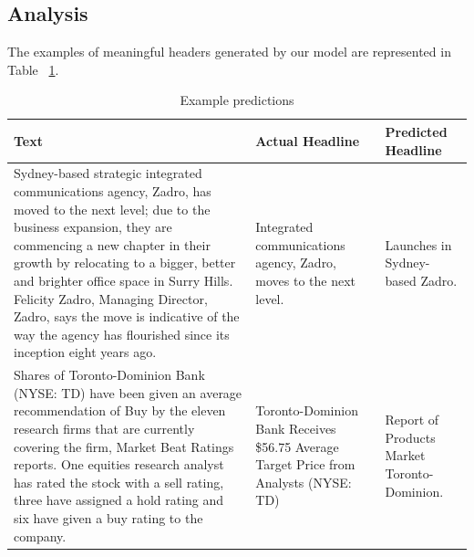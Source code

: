 \subsection{Analysis}

The examples of meaningful headers generated by our model are represented in 
Table ~\ref{tab:results-table}.

\begin{center}
\begin{table}[!htb]
\centering
\caption{Example predictions}
\label{tab:results-table}
\begin{tabular}{|l|l|l|}
\hline
\textbf{Text} & \textbf{Actual Headline} & \textbf{Predicted Headline} \\ \hline

\begin{minipage}[t]{0.4\columnwidth}%
Sydney-based strategic integrated communications agency, Zadro, has moved to the next level; due to the business expansion, they are commencing a new chapter in their growth by relocating to a bigger, better and brighter office space in Surry Hills. Felicity Zadro, Managing Director, Zadro, says the move is indicative of the way the agency has flourished since its inception eight years ago.             
\end{minipage}
 & 
\begin{minipage}[t]{0.3\columnwidth}%
 Integrated communications agency, Zadro, moves to the next level. 
\end{minipage}
 & 
\begin{minipage}[t]{0.3\columnwidth}%
 Launches in Sydney-based Zadro. 
\end{minipage}  \\ \hline


\begin{minipage}[t]{0.4\columnwidth}%
Shares of Toronto-Dominion Bank (NYSE: TD) have been given an average recommendation of Buy by the eleven research firms that are currently covering the firm, Market Beat Ratings reports. One equities research analyst has rated the stock with a sell rating, three have assigned a hold rating and six have given a buy rating to the company.           
\end{minipage}
 & 
\begin{minipage}[t]{0.3\columnwidth}%
Toronto-Dominion Bank Receives \$56.75 Average Target Price from Analysts (NYSE: TD) 
\end{minipage}
 & 
\begin{minipage}[t]{0.3\columnwidth}%
Report of Products Market Toronto-Dominion. 
\end{minipage}  \\ \hline



\end{tabular}
\end{table}
\end{center}
